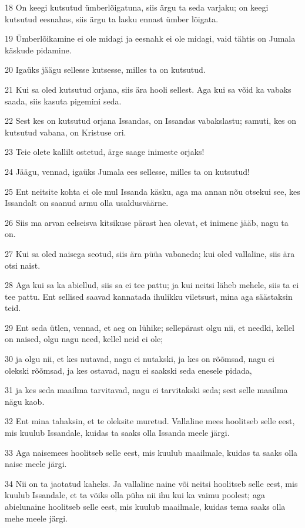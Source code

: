 \par 18 On keegi kutsutud ümberlõigatuna, siis ärgu ta seda varjaku; on keegi kutsutud eesnahas, siis ärgu ta lasku ennast ümber lõigata.
\par 19 Ümberlõikamine ei ole midagi ja eesnahk ei ole midagi, vaid tähtis on Jumala käskude pidamine.
\par 20 Igaüks jäägu sellesse kutsesse, milles ta on kutsutud.
\par 21 Kui sa oled kutsutud orjana, siis ära hooli sellest. Aga kui sa võid ka vabaks saada, siis kasuta pigemini seda.
\par 22 Sest kes on kutsutud orjana Issandas, on Issandas vabakslastu; samuti, kes on kutsutud vabana, on Kristuse ori.
\par 23 Teie olete kallilt ostetud, ärge saage inimeste orjaks!
\par 24 Jäägu, vennad, igaüks Jumala ees sellesse, milles ta on kutsutud!
\par 25 Ent neitsite kohta ei ole mul Issanda käsku, aga ma annan nõu otsekui see, kes Issandalt on saanud armu olla usaldusväärne.
\par 26 Siis ma arvan eelseisva kitsikuse pärast hea olevat, et inimene jääb, nagu ta on.
\par 27 Kui sa oled naisega seotud, siis ära püüa vabaneda; kui oled vallaline, siis ära otsi naist.
\par 28 Aga kui sa ka abiellud, siis sa ei tee pattu; ja kui neitsi läheb mehele, siis ta ei tee pattu. Ent sellised saavad kannatada ihulikku viletsust, mina aga säästaksin teid.
\par 29 Ent seda ütlen, vennad, et aeg on lühike; sellepärast olgu nii, et needki, kellel on naised, olgu nagu need, kellel neid ei ole;
\par 30 ja olgu nii, et kes nutavad, nagu ei nutakski, ja kes on rõõmsad, nagu ei olekski rõõmsad, ja kes ostavad, nagu ei saakski seda enesele pidada,
\par 31 ja kes seda maailma tarvitavad, nagu ei tarvitakski seda; sest selle maailma nägu kaob.
\par 32 Ent mina tahaksin, et te oleksite muretud. Vallaline mees hoolitseb selle eest, mis kuulub Issandale, kuidas ta saaks olla Issanda meele järgi.
\par 33 Aga naisemees hoolitseb selle eest, mis kuulub maailmale, kuidas ta saaks olla naise meele järgi.
\par 34 Nii on ta jaotatud kaheks. Ja vallaline naine või neitsi hoolitseb selle eest, mis kuulub Issandale, et ta võiks olla püha nii ihu kui ka vaimu poolest; aga abielunaine hoolitseb selle eest, mis kuulub maailmale, kuidas tema saaks olla mehe meele järgi.
